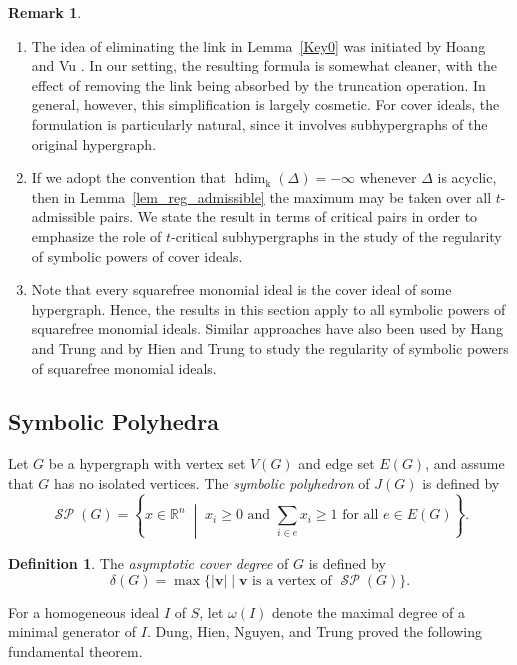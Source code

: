 \documentclass[12pt,amscd]{amsart}
\theoremstyle{definition}
\newtheorem{defn}[thm]{Definition}
\newtheorem{rem}[thm]{Remark}
\DeclareMathOperator{\hdim}{hdim}
\DeclareMathOperator{\SP}{\mathcal{SP}}
\def\v {\mathbf v}
\def\k {\mathrm k}
\begin{document}
\begin{rem}
\begin{enumerate}
    \item The idea of eliminating the link in Lemma~\ref{Key0} was initiated by Hoang and Vu \cite[Lemma 2.9]{HV}. In our setting, the resulting formula is somewhat cleaner, with the effect of removing the link being absorbed by the truncation operation. In general, however, this simplification is largely cosmetic. For cover ideals, the formulation is particularly natural, since it involves subhypergraphs of the original hypergraph.
    \item If we adopt the convention that $\hdim_{\k}(\Delta) = -\infty$ whenever $\Delta$ is acyclic, then in Lemma~\ref{lem_reg_admissible} the maximum may be taken over all $t$-admissible pairs. We state the result in terms of critical pairs in order to emphasize the role of $t$-critical subhypergraphs in the study of the regularity of symbolic powers of cover ideals.
    \item Note that every squarefree monomial ideal is the cover ideal of some hypergraph. Hence, the results in this section apply to all symbolic powers of squarefree monomial ideals. Similar approaches have also been used by Hang and Trung \cite{HaT} and by Hien and Trung \cite{HiT} to study the regularity of symbolic powers of squarefree monomial ideals.
\end{enumerate}
\end{rem}

\subsection{Symbolic Polyhedra}

Let $G$ be a hypergraph with vertex set $V(G)$ and edge set $E(G)$, and assume that $G$ has no isolated vertices. The \emph{symbolic polyhedron} of $J(G)$ is defined by
\[
\SP(G)
=
\left\{
x \in \mathbb{R}^n
\;\middle|\;
x_i \ge 0
\text{ and }
\sum_{i \in e} x_i \ge 1
\text{ for all } e \in E(G)
\right\}.
\]

\begin{defn}
The \emph{asymptotic cover degree} of $G$ is defined by
\[
\delta(G)
=
\max \{ |\v| \mid \v \text{ is a vertex of } \SP(G) \}.
\]
\end{defn}

For a homogeneous ideal $I$ of $S$, let $\omega(I)$ denote the maximal degree of a minimal generator of $I$. Dung, Hien, Nguyen, and Trung \cite{DHNT} proved the following fundamental theorem.
\end{document}
